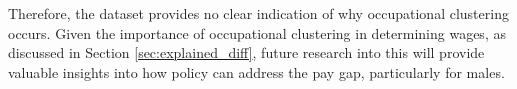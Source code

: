 \documentclass[class=article, crop=false]{standalone}
\begin{document}
Therefore, the dataset provides no clear indication of why occupational clustering occurs. Given the importance of occupational clustering in determining wages, as discussed in Section \ref{sec:explained_diff}, future research into this will provide valuable insights into how policy can address the pay gap, particularly for males.

\end{document}

